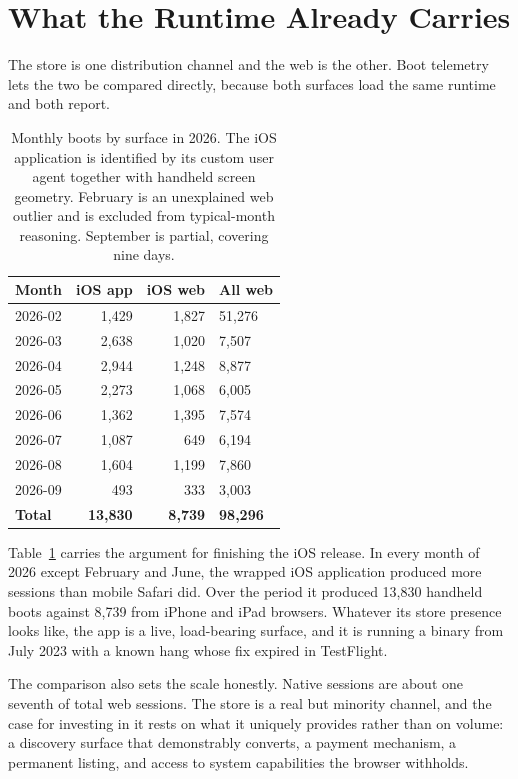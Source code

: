 \documentclass[10pt,letterpaper,twocolumn]{article}
\begin{document}
\section{What the Runtime Already Carries}
\label{sec:runtime}

The store is one distribution channel and the web is the other. Boot
telemetry lets the two be compared directly, because both surfaces load
the same runtime and both report.

\begin{table}[t]
\centering
\small
\caption{Monthly boots by surface in 2026. The iOS application is identified by its custom user agent together with handheld screen geometry. February is an unexplained web outlier and is excluded from typical-month reasoning. September is partial, covering nine days.}
\label{tab:boots}
\begin{tabularx}{\columnwidth}{@{}l r r X@{}}
\toprule
\textbf{Month} & \textbf{iOS app} & \textbf{iOS web} & \textbf{All web} \\
\midrule
2026-02 & 1{,}429 & 1{,}827 & 51{,}276 \\
2026-03 & 2{,}638 & 1{,}020 & 7{,}507 \\
2026-04 & 2{,}944 & 1{,}248 & 8{,}877 \\
2026-05 & 2{,}273 & 1{,}068 & 6{,}005 \\
2026-06 & 1{,}362 & 1{,}395 & 7{,}574 \\
2026-07 & 1{,}087 & \phantom{0}649 & 6{,}194 \\
2026-08 & 1{,}604 & 1{,}199 & 7{,}860 \\
2026-09 & \phantom{0}493 & \phantom{0}333 & 3{,}003 \\
\midrule
\textbf{Total} & \textbf{13{,}830} & \textbf{8{,}739} & \textbf{98{,}296} \\
\bottomrule
\end{tabularx}
\end{table}

Table~\ref{tab:boots} carries the argument for finishing the iOS
release. In every month of 2026 except February and June, the wrapped
iOS application produced more sessions than mobile Safari did. Over the
period it produced 13,830 handheld boots against 8,739 from iPhone and
iPad browsers. Whatever its store presence looks like, the app is a
live, load-bearing surface, and it is running a binary from July 2023
with a known hang whose fix expired in TestFlight.

The comparison also sets the scale honestly. Native sessions are about
one seventh of total web sessions. The store is a real but minority
channel, and the case for investing in it rests on what it uniquely
provides rather than on volume: a discovery surface that demonstrably
converts, a payment mechanism, a permanent listing, and access to system
capabilities the browser withholds.
\end{document}
